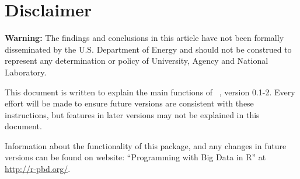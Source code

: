 \chapter*{Disclaimer}

{\color{red} \bf Warning:}
The findings and conclusions in this article have not been
formally disseminated by the U.S. Department of Energy
and should not be construed to represent any determination or
policy of University, Agency and National Laboratory.

This document is written to explain the main
functions of ~\citep{Schmidt2013pbdDEMOpackage}, version 0.1-2.
Every effort will be made to ensure future versions are consistent with
these instructions, but features in later versions may not be explained
in this document.

Information about the functionality of this package,
and any changes in future versions can be found on website:
``Programming with Big Data in R'' at
\url{http://r-pbd.org/}.

